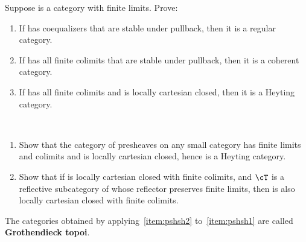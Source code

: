 \begin{ex}\label{ex:lccc}
  Suppose \cS is a category with finite limits.
  Prove:
  \begin{enumerate}
  \item If \cS has coequalizers that are stable under pullback, then it is a regular category.
  \item If \cS has all finite colimits that are stable under pullback, then it is a coherent category.
  \item If \cS has all finite colimits and is locally cartesian closed, then it is a Heyting category.
  \end{enumerate}
\end{ex}

\begin{ex}\label{ex:presheaves-sheaves}\ 
  \begin{enumerate}
  \item Show that the category of presheaves on any small category has finite limits and colimits and is locally cartesian closed, hence is a Heyting category.\label{item:pshsh1}
  \item Show that if \cS is locally cartesian closed with finite colimits, and $\cT$ is a reflective subcategory of \cS whose reflector preserves finite limits, then \cT is also locally cartesian closed with finite colimits.\label{item:pshsh2}
  \end{enumerate}
  The categories obtained by applying~\ref{item:pshsh2} to~\ref{item:pshsh1} are called \textbf{Grothendieck topoi}.
\end{ex}



